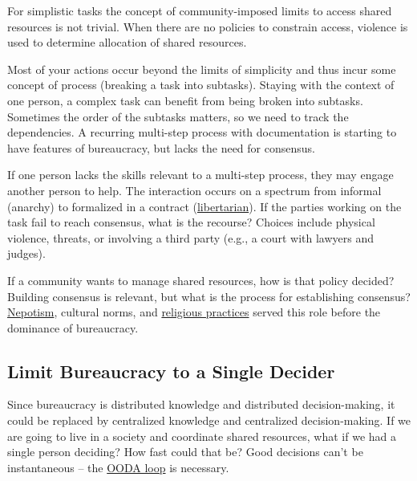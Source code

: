 For simplistic tasks the concept of community-imposed limits to access \glspl{shared resource}
is not trivial. When there are no policies to constrain access, violence is used to determine allocation of shared resources.

Most of your actions occur beyond the limits of simplicity and thus incur some concept of \gls{process}
(breaking a task into subtasks). Staying with the context of one person, a complex task can benefit from being broken into subtasks. Sometimes the order of the subtasks matters, so we need to track the dependencies. A recurring multi-step process with documentation is starting to have features of bureaucracy, but lacks the need for consensus. 


If one person lacks the skills relevant to a multi-step process, they may engage another person to help. The interaction occurs on a spectrum from informal (anarchy) to formalized in a contract (\href{https://en.wikipedia.org/wiki/Libertarianism}{libertarian}).
If the parties working on the task fail to reach consensus, what is the recourse? Choices include physical violence, threats, or involving a third party (e.g., a court with lawyers and judges). 


If a community wants to manage shared resources, how is that policy decided?  Building consensus is relevant, but what is the process for establishing consensus? 
\href{https://en.wikipedia.org/wiki/Nepotism}{Nepotism},
cultural norms, and 
\href{https://en.wikipedia.org/wiki/Religion}{religious practices}
served this role before the dominance of bureaucracy. 


\subsection*{Limit Bureaucracy to a Single Decider\label{sec:single-decider}}

Since bureaucracy is distributed knowledge and distributed decision-making, it could be replaced by centralized knowledge and centralized decision-making. If we are going to live in a society and coordinate shared resources, what if we had a single person deciding? How fast could that be? Good decisions can't be instantaneous -- the 
\href{https://en.wikipedia.org/wiki/OODA_loop}{OODA loop} 
is necessary. 

